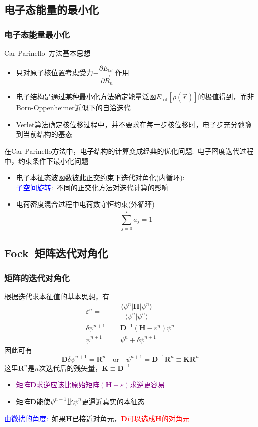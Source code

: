 \documentclass[cjk,slidestop,compress,mathserif,blue]{beamer}
\begin{document}
\subsection{电子态能量的最小化}
\frame
{
	\frametitle{电子态能量最小化}
	\textrm{Car-Parinello~}方法基本思想
	\begin{itemize}
		\item 只对原子核位置考虑受力$-\dfrac{\partial E_{\mathrm{tot}}}{\partial\vec R_n}$作用
		\item 电子结构是通过某种最小化方法确定能量泛函$E_{\mathrm{tot}}[\rho(\vec r)]$的极值得到，而非\textrm{Born-Oppenheimer}近似下的自洽迭代
		\item \textrm{Verlet}算法确定核位移过程中，并不要求在每一步核位移时，电子步充分弛豫到当前结构的基态
	\end{itemize}
	在\textrm{Car-Parinello}方法中，电子结构的计算变成经典的优化问题:~电子密度迭代过程中，约束条件下最小化问题
	\begin{itemize}
		\item 电子本征态波函数彼此正交约束下迭代对角化(内循环):\\
			\textcolor{blue}{子空间旋转}:~不同的正交化方法对迭代计算的影响
		\item 电荷密度混合过程中电荷数守恒约束(外循环)
			\begin{displaymath}
				\sum\limits_{j=0}^i a_j=1
			\end{displaymath}
	\end{itemize}
}

\subsection{\rm{Fock~}矩阵迭代对角化}
\frame
{
	\frametitle{矩阵的迭代对角化}
	根据迭代求本征值的基本思想，有
	\begin{displaymath}
		\begin{aligned}
			\varepsilon^n=&\dfrac{\langle\psi^n|\mathbf{H}|\psi^n\rangle}{\langle\psi^n|\psi^n\rangle}\\
			\delta\psi^{n+1}=&\mathbf{D}^{-1}(\mathbf{H}-\varepsilon^n)\psi^n\\
			\psi^{n+1}=&\psi^n+\delta\psi^{n+1}
		\end{aligned}
	\end{displaymath}
		因此可有
		\begin{displaymath}
			\mathbf{D}\delta\psi^{n+1}=\mathbf{R}^{n}\quad \mathrm{or}\quad \psi^{n+1}=\mathbf{D}^{-1}\mathbf{R}^n\equiv\mathbf{K}\mathbf{R}^n
		\end{displaymath}
		这里$\mathbf{R}^n$是$n$次迭代后的残矢量，$\mathbf{K}\equiv\mathbf{D}^{-1}$
		\begin{itemize}
			\item \textcolor{purple}{矩阵$\mathbf{D}$求逆应该比原始矩阵$(\mathbf{H}-\varepsilon)$求逆更容易}
			\item 矩阵$\mathbf{D}$能使$\psi^{n+1}$比$\psi^{n}$更逼近真实的本征态
		\end{itemize}
		\textcolor{blue}{由微扰的角度:~}如果$\mathbf{H}$已接近对角元，\textcolor{red}{$\mathbf{D}$可以选成$\mathbf{H}$的对角元}
}
\end{document}
